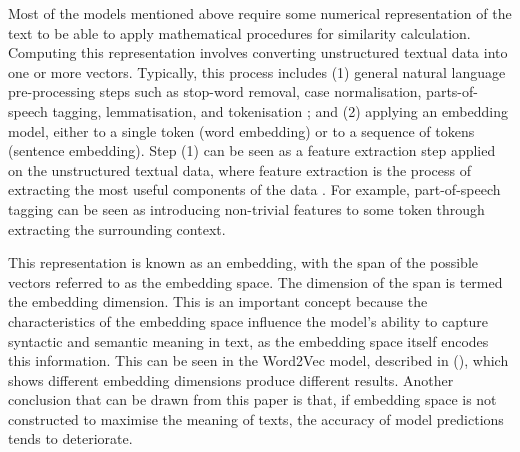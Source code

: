 \documentclass[10pt,oneside]{report}
\begin{document}
Most of the models mentioned above require some numerical representation of the text to be able to apply mathematical procedures for similarity calculation. Computing this representation involves converting unstructured textual data into one or more vectors. Typically, this process includes (1) general natural language pre-processing steps such as stop-word removal, case normalisation, parts-of-speech tagging, lemmatisation, and tokenisation \cite{tabassum2020survey}; and (2) applying an embedding model, either to a single token (word embedding) or to a sequence of tokens (sentence embedding). Step (1) can be seen as a feature extraction step applied on the unstructured textual data, where feature extraction is the process of extracting the most useful components of the data \cite{sammons2016edison}. For example, part-of-speech tagging can be seen as introducing non-trivial features to some token through extracting the surrounding context. 

This representation is known as an embedding, with the span of the possible vectors referred to as the embedding space. The dimension of the span is termed the embedding dimension. This is an important concept because the characteristics of the embedding space influence the model's ability to capture syntactic and semantic meaning in text, as the embedding space itself encodes this information. This can be seen in the Word2Vec model, described in (\citet{bojanowski2017enriching}), which shows different embedding dimensions produce different results. Another conclusion that can be drawn from this paper is that, if embedding space is not constructed to maximise the meaning of texts, the accuracy of model predictions tends to deteriorate. 
\end{document}
